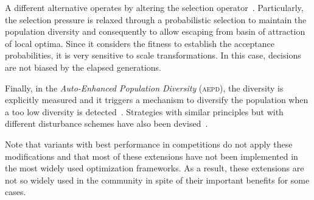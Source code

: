 A different alternative operates by altering the selection operator~\cite{sa2008exploration}.
%
Particularly, the selection pressure is relaxed through a probabilistic selection to maintain the population diversity and consequently 
to allow escaping from basin of attraction of local optima.
%
Since it considers the fitness to establish the acceptance probabilities, it is very sensitive to scale transformations.
%
In this case, decisions are not biased by the elapsed generations.

Finally, in the \textit{Auto-Enhanced Population Diversity} (\textsc{aepd}), the diversity is explicitly measured and it triggers a mechanism
to diversify the population when a too low diversity is detected~\cite{yang2015differential}.
%
Strategies with similar principles but with different disturbance schemes have also been devised~\cite{zhao2016differential}.

Note that \DE{} variants with best performance in competitions do not apply these modifications
and that most of these extensions have not been implemented in the most widely used optimization frameworks.
%
As a result, these extensions are not so widely used in the community in spite of their important benefits
for some cases.

